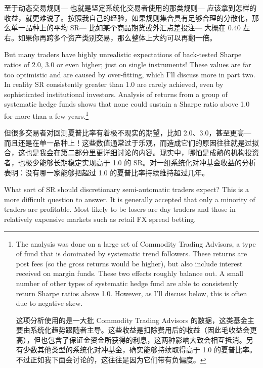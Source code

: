 \begin{chineseblock}至于动态交易规则--- 也就是坚定系统化交易者使用的那类规则--- 应该拿到怎样的收益，就更难说了。按照我自己的经验，如果规则集合具有足够合理的分散化，那么单一品种上的平均 SR--- 比如某个商品期货或外汇点差投注--- 大概在 0.40 左右。如果你再跨多个资产类别交易，那么整体上大约可以再翻一倍。\end{chineseblock}

\bipairgap

\begin{englishblock} But many traders have highly unrealistic expectations of back-tested Sharpe ratios of 2.0, 3.0 or even higher; just on single instruments! These values are far too optimistic and are caused by over-fitting, which I'll discuss more in part two. In reality SR consistently greater than 1.0 are rarely achieved, even by sophisticated institutional investors. Analysis of returns from a group of systematic hedge funds shows that none could sustain a Sharpe ratio above 1.0 for more than a few years.\footnote{The analysis was done on a large set of Commodity Trading Advisors, a type of fund that is dominated by systematic trend followers. These returns are post fees (so the gross returns would be higher), but also include interest received on margin funds. These two effects roughly balance out. A small number of other types of systematic hedge fund are able to consistently return Sharpe ratios above 1.0. However, as I'll discuss below, this is often due to negative skew. \par 这项分析使用的是一大批 Commodity Trading Advisors 的数据，这类基金主要由系统化趋势跟随者主导。这些收益是扣除费用后的收益（因此毛收益会更高），但也包含了保证金资金所获得的利息，这两种影响大致会相互抵消。另有少数其他类型的系统化对冲基金，确实能够持续取得高于 1.0 的夏普比率。不过正如我下面会讨论的，这往往是因为它们带有负偏度。}\end{englishblock}

\begin{chineseblock}但很多交易者对回测夏普比率有着极不现实的期望，比如 2.0、3.0，甚至更高--- 而且还是在单一品种上！这些数值通常过于乐观，而造成它们的原因往往就是过拟合，这也是我会在第二部分里更详细讨论的内容。现实中，哪怕是成熟的机构投资者，也极少能够长期稳定实现高于 1.0 的 SR。对一组系统化对冲基金收益的分析表明：没有哪一家能够把超过 1.0 的夏普比率持续维持超过几年。\end{chineseblock}

\bipairgap

\begin{englishblock} What sort of SR should discretionary semi-automatic traders expect? This is a more difficult question to answer. It is generally accepted that only a minority of traders are profitable. Most likely to be losers are day traders and those in relatively expensive markets such as retail FX spread betting. \end{englishblock}

